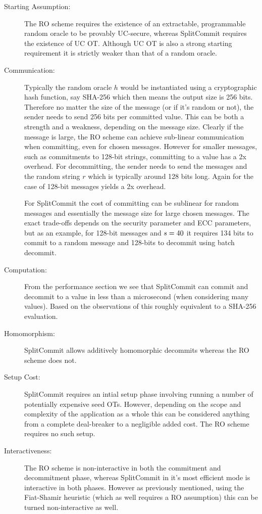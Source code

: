 \begin{description}
  \item[Starting Assumption:] The RO scheme requires the existence of an extractable, programmable random oracle to be provably UC-secure, whereas SplitCommit requires the existence of UC OT. Although UC OT is also a strong starting requirement it is strictly weaker than that of a random oracle.
  \item[Communication:] Typically the random oracle $h$ would be instantiated using a cryptographic hash function, say SHA-256 which then means the output size is 256 bits. Therefore no matter the size of the message (or if it's random or not), the sender needs to send 256 bits per committed value. This can be both a strength and a weakness, depending on the message size. Clearly if the message is large, the RO scheme can achieve sub-linear communication when committing, even for chosen messages. However for smaller messages, such as \eg commitments to 128-bit strings, committing to a value has a 2x overhead. For decommitting, the sender needs to send the messages and the random string $r$ which is typically around 128 bits long. Again for the case of 128-bit messages yields a 2x overhead.

  For SplitCommit the cost of committing can be sublinear for random messages and essentially the message size for large chosen messages. The exact trade-offs depends on the security parameter and ECC parameters, but as an example, for 128-bit messages and $s=40$ it requires 134 bits to commit to a random message and 128-bits to decommit using batch decommit.

  \item[Computation:] From the performance section we see that SplitCommit can commit and decommit to a value in less than a microsecond (when considering many values). Based on the observations of \cite{DBLP:conf/pkc/CascudoDDGNT15} this roughly equivalent to a SHA-256 evaluation.
  \item[Homomorphism:] SplitCommit allows additively homomorphic decommits whereas the RO scheme does not.
  \item[Setup Cost:] SplitCommit requires an intial setup phase involving running a number of potentially expensive seed OTs. However, depending on the scope and complexity of the application as a whole this can be considered anything from a complete deal-breaker to a negligible added cost. The RO scheme requires no such setup.
  \item[Interactiveness:] The RO scheme is non-interactive in both the commitment and decommitment phase, whereas SplitCommit in it's most efficient mode is interactive in both phases. However as previously mentioned, using the Fiat-Shamir heuristic (which as well requires a RO assumption) this can be turned non-interactive as well.
\end{description}


